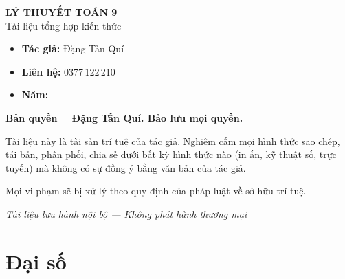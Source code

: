 \documentclass[12pt,a4paper]{article}
\begin{document}
\newpage

\thispagestyle{empty}
\vspace*{5cm}
\begin{center}
  {\Large\bfseries LÝ THUYẾT TOÁN 9}\\[8pt]
  {\large Tài liệu tổng hợp kiến thức}
\end{center}

\vspace{2cm}

\begin{tcolorbox}[
  enhanced, colback=red!3!white, colframe=red!60!black,
  fonttitle=\bfseries, title={Thông tin bản quyền},
  boxrule=1.5pt
]
  \begin{itemize}[leftmargin=*]
    \item \textbf{Tác giả:} Đặng Tấn Quí
    \item \textbf{Liên hệ:} 0377\,122\,210
    \item \textbf{Năm:} \the\year
  \end{itemize}

  \vspace{8pt}
  \textbf{Bản quyền \textcopyright\ \the\year\ Đặng Tấn Quí. Bảo lưu mọi quyền.}

  \vspace{6pt}
  Tài liệu này là tài sản trí tuệ của tác giả. Nghiêm cấm mọi hình thức sao chép, tái bản, phân phối, chia sẻ dưới bất kỳ hình thức nào (in ấn, kỹ thuật số, trực tuyến) mà không có sự đồng ý bằng văn bản của tác giả.

  \vspace{6pt}
  Mọi vi phạm sẽ bị xử lý theo quy định của pháp luật về sở hữu trí tuệ.
\end{tcolorbox}

\vfill
\begin{center}
  \small\textit{Tài liệu lưu hành nội bộ --- Không phát hành thương mại}
\end{center}

\newpage

\tableofcontents
\newpage


\section{Đại số}
\end{document}
